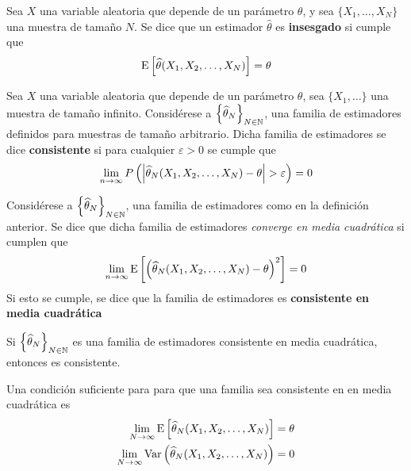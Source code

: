 \begin{definicion}
Sea $X$ una variable aleatoria que depende de un parámetro $\theta$, y sea $\{ X_1, \dots, X_N \}$ una muestra de tamaño $N$. Se dice que un estimador $\widehat{\theta}$ es \textbf{insesgado} si cumple que
\begin{equation}
\mathrm{E}\left[ \widehat{\theta}(X_1,X_2,\dots,X_N) \right] = \theta
\end{equation}

\end{definicion}

\begin{definicion}
Sea $X$ una variable aleatoria que depende de un parámetro $\theta$, sea $\{ X_1, \dots\}$ una muestra de tamaño infinito.
%
Considérese a $\left\{ \widehat{\theta}_N \right\}_{N\in \mathbb{N}}$, una familia de estimadores definidos para muestras de tamaño arbitrario. 
%
Dicha familia de estimadores se dice \textbf{consistente} si para cualquier $\varepsilon > 0$ se cumple que
\begin{equation}
\lim_{n\rightarrow\infty} P\left( \left| \widehat{\theta}_N(X_1,X_2,\dots,X_N)-\theta \right| > \varepsilon \right) = 0
\end{equation}
\end{definicion}

\begin{definicion}
Considérese a $\left\{ \widehat{\theta}_N \right\}_{N\in \mathbb{N}}$, una familia de estimadores como en la definición anterior.
%
Se dice que dicha familia de estimadores \textit{converge en media cuadrática} si cumplen que
\begin{equation}
\lim_{n\rightarrow\infty} \mathrm{E}\left[ \left( \widehat{\theta}_N(X_1,X_2,\dots,X_N) - \theta \right)^{2} \right] = 0
\end{equation}
Si esto se cumple, se dice que la familia de estimadores es \textbf{consistente en media cuadrática} \end{definicion}

\begin{proposicion}
Si $\left\{ \widehat{\theta}_N \right\}_{N\in \mathbb{N}}$ es una familia de estimadores consistente en media cuadrática, entonces es consistente.
\end{proposicion}

\begin{corolario}
Una condición suficiente para para que una familia sea consistente en en media cuadrática es
\begin{align}
\lim_{N\rightarrow\infty} \mathrm{E}\left[ \widehat{\theta}_N(X_1,X_2,\dots,X_N) \right] &= \theta \\
\lim_{N\rightarrow\infty} \mathrm{Var}\left( \widehat{\theta}_N(X_1,X_2,\dots,X_N) \right) &= 0
\end{align}
\end{corolario}


